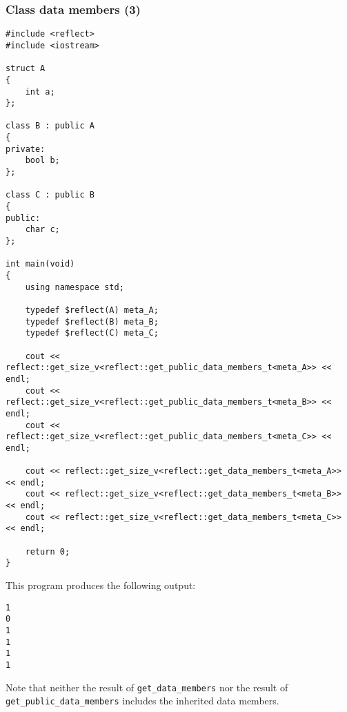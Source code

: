 \subsubsection{Class data members (3)}

\begin{verbatim}
#include <reflect>
#include <iostream>

struct A
{
	int a;
};

class B : public A
{
private:
	bool b;
};

class C : public B
{
public:
	char c;
};

int main(void)
{
	using namespace std;

	typedef $reflect(A) meta_A;
	typedef $reflect(B) meta_B;
	typedef $reflect(C) meta_C;

	cout << reflect::get_size_v<reflect::get_public_data_members_t<meta_A>> << endl;
	cout << reflect::get_size_v<reflect::get_public_data_members_t<meta_B>> << endl;
	cout << reflect::get_size_v<reflect::get_public_data_members_t<meta_C>> << endl;

	cout << reflect::get_size_v<reflect::get_data_members_t<meta_A>> << endl;
	cout << reflect::get_size_v<reflect::get_data_members_t<meta_B>> << endl;
	cout << reflect::get_size_v<reflect::get_data_members_t<meta_C>> << endl;

	return 0;
}
\end{verbatim}

This program produces the following output:

\begin{verbatim}
1
0
1
1
1
1
\end{verbatim}

Note that neither the result of \texttt{get\_data\_members} nor the result of
\texttt{get\_public\_data\_members} includes the inherited data members.
